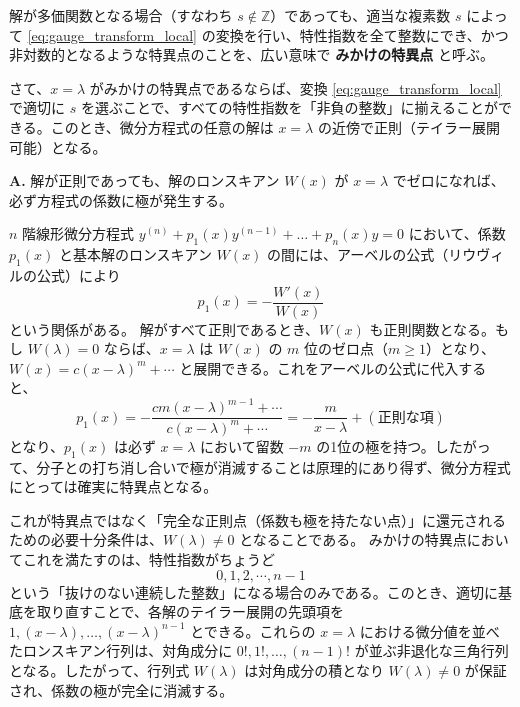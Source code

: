 \begin{definition}[みかけの特異点の拡張]
解が多価関数となる場合（すなわち $s \notin \mathbb{Z}$）であっても、適当な複素数 $s$ によって \eqref{eq:gauge_transform_local} の変換を行い、特性指数を全て整数にでき、かつ非対数的となるような特異点のことを、広い意味で \textbf{みかけの特異点} と呼ぶ。
\end{definition}

さて、$x=\lambda$ がみかけの特異点であるならば、変換 \eqref{eq:gauge_transform_local} で適切に $s$ を選ぶことで、すべての特性指数を「非負の整数」に揃えることができる。このとき、微分方程式の任意の解は $x=\lambda$ の近傍で正則（テイラー展開可能）となる。

\begin{Q}[【核心】任意の解が正則（特異性を持たない）になるように変換できたとしても、微分方程式の係数にとっては $x=\lambda$ が依然として極（特異点）になり得るのはなぜか？分子と分母が打ち消し合って極が消えることはないのか？]
\textbf{A.} 解が正則であっても、解のロンスキアン $W(x)$ が $x=\lambda$ でゼロになれば、必ず方程式の係数に極が発生する。

$n$ 階線形微分方程式 $y^{(n)} + p_1(x) y^{(n-1)} + \dots + p_n(x) y = 0$ において、係数 $p_1(x)$ と基本解のロンスキアン $W(x)$ の間には、アーベルの公式（リウヴィルの公式）により
\[
p_1(x) = -\frac{W'(x)}{W(x)}
\]
という関係がある。
解がすべて正則であるとき、$W(x)$ も正則関数となる。もし $W(\lambda) = 0$ ならば、$x=\lambda$ は $W(x)$ の $m$ 位のゼロ点（$m \ge 1$）となり、$W(x) = c(x-\lambda)^m + \cdots$ と展開できる。これをアーベルの公式に代入すると、
\[
p_1(x) = -\frac{cm(x-\lambda)^{m-1} + \cdots}{c(x-\lambda)^m + \cdots} = -\frac{m}{x-\lambda} + (\text{正則な項})
\]
となり、$p_1(x)$ は必ず $x=\lambda$ において留数 $-m$ の1位の極を持つ。したがって、分子との打ち消し合いで極が消滅することは原理的にあり得ず、微分方程式にとっては確実に特異点となる。

これが特異点ではなく「完全な正則点（係数も極を持たない点）」に還元されるための必要十分条件は、$W(\lambda) \neq 0$ となることである。
みかけの特異点においてこれを満たすのは、特性指数がちょうど
\[
0, 1, 2, \cdots, n-1
\]
という「抜けのない連続した整数」になる場合のみである。このとき、適切に基底を取り直すことで、各解のテイラー展開の先頭項を $1, (x-\lambda), \dots, (x-\lambda)^{n-1}$ とできる。これらの $x=\lambda$ における微分値を並べたロンスキアン行列は、対角成分に $0!, 1!, \dots, (n-1)!$ が並ぶ非退化な三角行列となる。したがって、行列式 $W(\lambda)$ は対角成分の積となり $W(\lambda) \neq 0$ が保証され、係数の極が完全に消滅する。
\end{Q}

